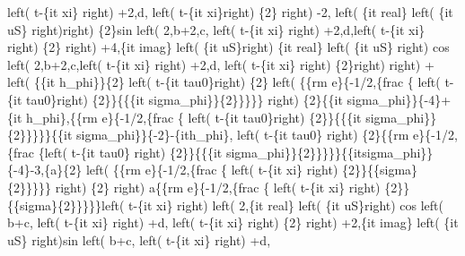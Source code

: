 \begin{maplegroup}
left( t-\{it xi\} right) +2,d, left( t-\{it xi\}right) \{2\} right) -2, left( \{it real\} left( \{it uS\} right)right) \{2\}sin left( 2,b+2,c, left( t-\{it xi\} right) +2,d,left( t-\{it xi\} right) \{2\} right) +4,\{it imag\} left( \{it uS\}right) \{it real\} left( \{it uS\} right) cos left( 2,b+2,c,left( t-\{it xi\} right) +2,d, left( t-\{it xi\} right) \{2\}right)  right) + left( \{\{it h\_phi\}\}\{2\} left( t-\{it tau0\}right) \{2\} left( \{\{rm e\}\{-1/2,\{frac \{ left( t-\{it tau0\}right) \{2\}\}\{\{\{it sigma\_phi\}\}\{2\}\}\}\}\} right) \{2\}\{\{it sigma\_phi\}\}\{-4\}+\{it h\_phi\},\{\{rm e\}\{-1/2,\{frac \{ left( t-\{it tau0\}right) \{2\}\}\{\{\{it sigma\_phi\}\}\{2\}\}\}\}\}\{\{it sigma\_phi\}\}\{-2\}-\{ith\_phi\}, left( t-\{it tau0\} right) \{2\}\{\{rm e\}\{-1/2,\{frac \{left( t-\{it tau0\} right) \{2\}\}\{\{\{it sigma\_phi\}\}\{2\}\}\}\}\}\{\{itsigma\_phi\}\}\{-4\}-3,\{a\}\{2\} left( \{\{rm e\}\{-1/2,\{frac \{ left( t-\{it xi\} right) \{2\}\}\{\{sigma\}\{2\}\}\}\}\} right) \{2\} right) a\{\{rm e\}\{-1/2,\{frac \{ left( t-\{it xi\} right) \{2\}\}\{\{sigma\}\{2\}\}\}\}\}left( t-\{it xi\} right)  left( 2,\{it real\} left( \{it uS\}right) cos left( b+c, left( t-\{it xi\} right) +d, left( t-\{it xi\} right) \{2\} right) +2,\{it imag\} left( \{it uS\} right)sin left( b+c, left( t-\{it xi\} right) +d, 
\end{maplegroup}
